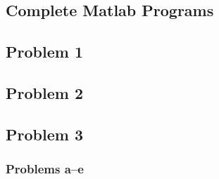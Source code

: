 \documentclass[a4paper]{article}
\begin{document}
		\begin{appendices}
		\section{Complete Matlab Programs}
			
			\subsection{Problem 1} 
			\vspace{2mm}		
			 
			\vspace{5mm}
			 
			\vspace{5mm}
			 
			\vspace{5mm}
			 
			\vspace{5mm}
			
			\subsection{Problem 2} 
			\vspace{2mm}			
			 
			\vspace{5mm}
			 
			\vspace{5mm}
			 
			\vspace{5mm}
			 
			\vspace{5mm}
			 
			\vspace{5mm}
			 
			\vspace{5mm}
			
			\subsection{Problem 3}
			\vspace{2mm}
				\subsubsection{Problems a--e} 
				\vspace{2mm}
				 
				\vspace{5mm}
				 
				\vspace{5mm}
				 
				\vspace{5mm}
				 
				\vspace{5mm}
				 
				\vspace{5mm}
				 
				\vspace{5mm}
				

\end{appendices}
\end{document}

